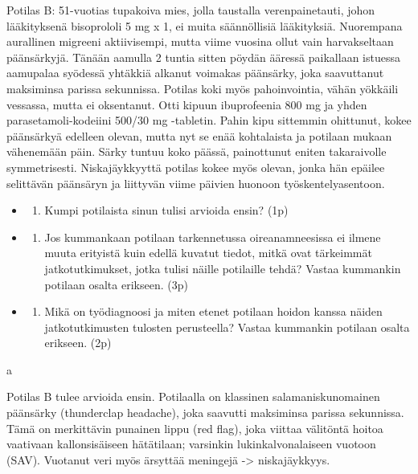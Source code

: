 \documentclass[
]{book}
\providecommand{\tightlist}{%
  \setlength{\itemsep}{0pt}\setlength{\parskip}{0pt}}
\begin{document}
Potilas B: 51-vuotias tupakoiva mies, jolla taustalla verenpainetauti, johon lääkityksenä bisoprololi 5 mg x 1, ei muita säännöllisiä lääkityksiä. Nuorempana aurallinen migreeni aktiivisempi, mutta viime vuosina ollut vain harvakseltaan päänsärkyjä. Tänään aamulla 2 tuntia sitten pöydän ääressä paikallaan istuessa aamupalaa syödessä yhtäkkiä alkanut voimakas päänsärky, joka saavuttanut maksiminsa parissa sekunnissa. Potilas koki myös pahoinvointia, vähän yökkäili vessassa, mutta ei oksentanut. Otti kipuun ibuprofeenia 800 mg ja yhden parasetamoli-kodeiini 500/30 mg -tabletin. Pahin kipu sittemmin ohittunut, kokee päänsärkyä edelleen olevan, mutta nyt se enää kohtalaista ja potilaan mukaan vähenemään päin. Särky tuntuu koko päässä, painottunut eniten takaraivolle symmetrisesti. Niskajäykkyyttä potilas kokee myös olevan, jonka hän epäilee selittävän päänsäryn ja liittyvän viime päivien huonoon työskentelyasentoon.

\begin{itemize}
\tightlist
\item
  \begin{enumerate}
  \def\labelenumi{\alph{enumi}.}
  \tightlist
  \item
    Kumpi potilaista sinun tulisi arvioida ensin? (1p)
  \end{enumerate}
\item
  \begin{enumerate}
  \def\labelenumi{\alph{enumi}.}
  \setcounter{enumi}{1}
  \tightlist
  \item
    Jos kummankaan potilaan tarkennetussa oireanamneesissa ei ilmene muuta erityistä kuin edellä kuvatut tiedot, mitkä ovat tärkeimmät jatkotutkimukset, jotka tulisi näille potilaille tehdä? Vastaa kummankin potilaan osalta erikseen. (3p)
  \end{enumerate}
\item
  \begin{enumerate}
  \def\labelenumi{\alph{enumi}.}
  \setcounter{enumi}{2}
  \tightlist
  \item
    Mikä on työdiagnoosi ja miten etenet potilaan hoidon kanssa näiden jatkotutkimusten tulosten perusteella? Vastaa kummankin potilaan osalta erikseen. (2p)
  \end{enumerate}
\end{itemize}

a

Potilas B tulee arvioida ensin. Potilaalla on klassinen salamaniskunomainen päänsärky (thunderclap headache), joka saavutti maksiminsa parissa sekunnissa. Tämä on merkittävin punainen lippu (red flag), joka viittaa välitöntä hoitoa vaativaan kallonsisäiseen hätätilaan; varsinkin lukinkalvonalaiseen vuotoon (SAV). Vuotanut veri myös ärsyttää meningejä -\textgreater{} niskajäykkyys.
\end{document}
